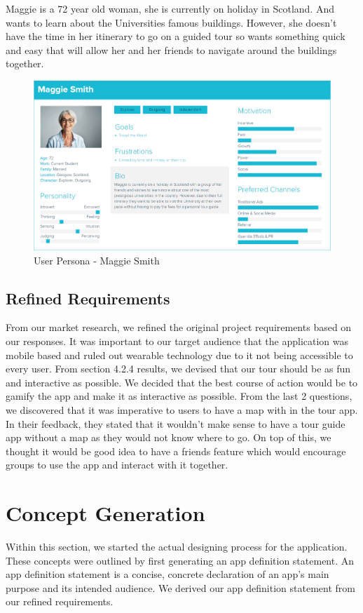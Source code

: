 \documentclass[a4,10pt,twocolumn]{article}
\begin{document}
Maggie is a 72 year old woman, she is currently on holiday in Scotland. And wants to learn about the Universities famous buildings. However, she doesn't have the time in her itinerary to go on a guided tour so wants something quick and easy that will allow her and her friends to navigate around the buildings together. 

\begin{figure}[!h]
    \centering
    \includegraphics[width=1\columnwidth]{UserPersonaImage_Maggie.PNG}
    \caption{User Persona - Maggie Smith}
    \label{fig:user3}
\end{figure}

\subsection{Refined Requirements}
From our market research, we refined the original project requirements based on our responses. It was important to our target audience that the application was mobile based and ruled out wearable technology due to it not being accessible to every user. From section 4.2.4 results, we devised that our tour should be as fun and interactive as possible. We decided that the best course of action would be to gamify the app and make it as interactive as possible. From the last 2 questions, we discovered that it was imperative to users to have a map with in the tour app. In their feedback, they stated that it wouldn't make sense to have a tour guide app without a map as they would not know where to go. On top of this, we thought it would be good idea to have a friends feature which would encourage groups to use the app and interact with it together.

\section{Concept Generation}
Within this section, we started the actual designing process for the application. These concepts were outlined by first generating an app definition statement. An app definition statement is a concise, concrete declaration of an app’s main purpose and its intended audience. We derived our app definition statement from our refined requirements.
\end{document}
